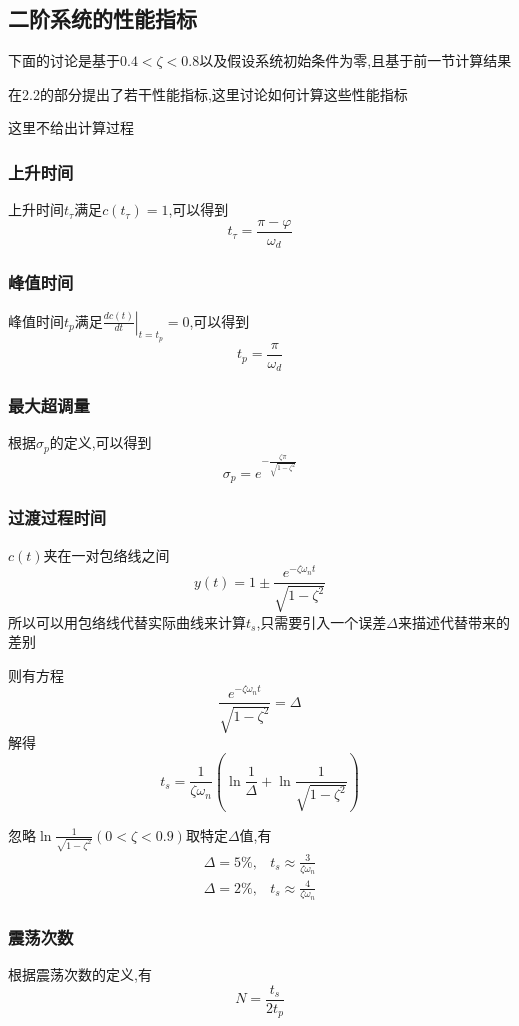 \documentclass[12pt,a4paper,oneside]{ctexart}
\begin{document}
\subsection{二阶系统的性能指标}
下面的讨论是基于$0.4<\zeta<0.8$以及假设系统初始条件为零,且基于前一节计算结果

在2.2的部分提出了若干性能指标,这里讨论如何计算这些性能指标

这里不给出计算过程

\subsubsection{上升时间}
上升时间$t_{\tau}$满足$c(t_{\tau})=1$,可以得到
\[
    t_{\tau} = \frac{\pi - \varphi}{\omega_d}
\]

\subsubsection{峰值时间}
峰值时间$t_p$满足$\left. \frac{dc(t)}{dt} \right|_{t = t_p} = 0$,可以得到
\[
    t_p=\frac{\pi}{\omega_d}
\]

\subsubsection{最大超调量}
根据$\sigma_p$的定义,可以得到
\[
    \sigma_p=e^{-\frac{\zeta \pi}{\sqrt{1-\zeta^2}}}
\]

\subsubsection{过渡过程时间}
$c(t)$夹在一对包络线之间
\[
    y(t)=1\pm \frac{e^{-\zeta \omega_n t}}{\sqrt{1-\zeta^2}}
\]
所以可以用包络线代替实际曲线来计算$t_s$,只需要引入一个误差$\Delta$来描述代替带来的差别

则有方程
\[
    \frac{e^{-\zeta \omega_n t}}{\sqrt{1-\zeta^2}}=\Delta
\]
解得
\[
    t_s=\frac{1}{\zeta \omega_n}\left(\ln{\frac{1}{\Delta}}+\ln{\frac{1}{\sqrt{1-\zeta^2}}}\right)
\]

忽略$\ln{\frac{1}{\sqrt{1-\zeta^2}}}(0<\zeta<0.9)$取特定$\Delta$值,有
\begin{align*}
    \Delta=5\%,&t_s\approx \frac{3}{\zeta \omega_n}\\
    \Delta=2\%,&t_s\approx \frac{4}{\zeta \omega_n}
\end{align*}

\subsubsection{震荡次数}
根据震荡次数的定义,有
\[
    N=\frac{t_s}{2t_p}
\]
\end{document}

